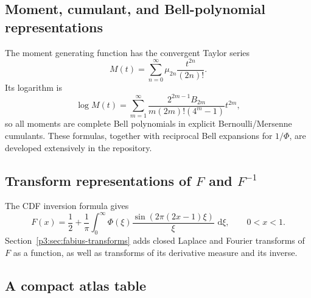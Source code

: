 \documentclass[11pt]{article}
\theoremstyle{definition}
\theoremstyle{remark}
\newcommand{\dd}{\,\mathrm d}
\begin{document}
\subsection{Moment, cumulant, and Bell-polynomial representations}

The moment generating function has the convergent Taylor series
\begin{equation}
 M(t)=\sum_{n=0}^{\infty}\mu_{2n}\frac{t^{2n}}{(2n)!}.       \label{p3:eq:M-moment-series}
\end{equation}
Its logarithm is
\begin{equation}
 \log M(t)=
 \sum_{m=1}^{\infty}
 \frac{2^{2m-1}B_{2m}}{m(2m)!(4^m-1)}t^{2m},                \label{p3:eq:M-cumulant}
\end{equation}
so all moments are complete Bell polynomials in explicit Bernoulli/Mersenne cumulants.
These formulas, together with reciprocal Bell expansions for \(1/\Phi\), are developed
extensively in the repository.

\subsection{Transform representations of \(F\) and \(F^{-1}\)}

The CDF inversion formula gives
\begin{equation}
 F(x)=\frac12+\frac1\pi\int_0^{\infty}
 \Phi(\xi)\frac{\sin(2\pi(2x-1)\xi)}{\xi}\,\dd\xi,
 \qquad 0<x<1.                                               \label{p3:eq:F-CDF-Fourier}
\end{equation}
Section~\ref{p3:sec:fabius-transforms} adds closed Laplace and Fourier transforms of \(F\) as
a function, as well as transforms of its derivative measure and its inverse.

\subsection{A compact atlas table}
\end{document}
